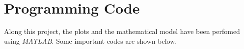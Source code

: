\chapter{Programming Code}
Along this project, the plots and the mathematical model have been perfomed using \textit{MATLAB}. Some important codes are shown below. 

















